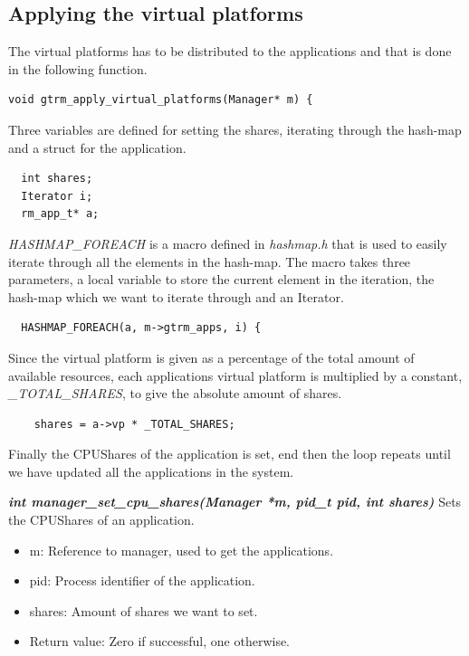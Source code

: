 \documentclass[nobiblatex]{LTHthesis}
\begin{document}
\subsection{Applying the virtual platforms}
The virtual platforms has to be distributed to the applications and that is done in the following function.
\begin{verbatim}
void gtrm_apply_virtual_platforms(Manager* m) {
\end{verbatim}
Three variables are defined for setting the shares, iterating through the hash-map and a struct for the application.
\begin{verbatim}
  int shares;
  Iterator i;
  rm_app_t* a;
\end{verbatim}
\emph{HASHMAP\_FOREACH} is a macro defined in \emph{hashmap.h} that is used to easily iterate through all the elements in the hash-map. The macro takes three parameters, a local variable to store the current element in the iteration, the hash-map which we want to iterate through and an Iterator. 
\begin{verbatim}
  HASHMAP_FOREACH(a, m->gtrm_apps, i) {
\end{verbatim}
Since the virtual platform is given as a percentage of the total amount of available resources, each applications virtual platform is multiplied by a constant, \emph{\_TOTAL\_SHARES}, to give the absolute amount of shares.
\begin{verbatim}
    shares = a->vp * _TOTAL_SHARES;
\end{verbatim}
Finally the CPUShares of the application is set, end then the loop repeats until we have updated all the applications in the system.

\begin{framed}
		\begin{flushleft}
		
			\textbf{\emph{{int manager\_set\_cpu\_shares(Manager *m, pid\_t pid, int shares)}}} \newline
			Sets the CPUShares of an application.
			\begin{itemize}
			\item m: Reference to manager, used to get the applications.
			\item pid: Process identifier of the application.
			\item shares: Amount of shares we want to set.
			\item Return value: Zero if successful, one otherwise.
			\end{itemize}
		\end{flushleft}	
\end{framed}
\end{document}
